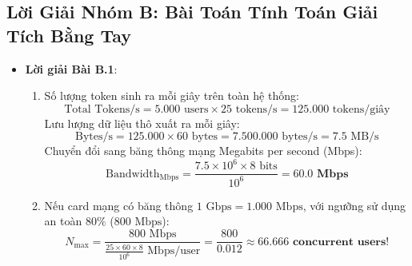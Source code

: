 \subsection{Lời Giải Nhóm B: Bài Toán Tính Toán Giải Tích Bằng Tay}
\begin{itemize}
  \item \textbf{Lời giải Bài B.1}:
  \begin{enumerate}
    \item Số lượng token sinh ra mỗi giây trên toàn hệ thống:
    \begin{equation*}
    \text{Total Tokens/s} = 5.000\text{ users} \times 25\text{ tokens/s} = 125.000\text{ tokens/giây}
    \end{equation*}
    Lưu lượng dữ liệu thô xuất ra mỗi giây:
    \begin{equation*}
    \text{Bytes/s} = 125.000 \times 60\text{ bytes} = 7.500.000\text{ bytes/s} = 7.5\text{ MB/s}
    \end{equation*}
    Chuyển đổi sang băng thông mạng Megabits per second (Mbps):
    \begin{equation*}
    \text{Bandwidth}_{\text{Mbps}} = \frac{7.5 \times 10^6 \times 8\text{ bits}}{10^6} = \mathbf{60.0\text{ Mbps}}
    \end{equation*}
    \item Nếu card mạng có băng thông $1\text{ Gbps} = 1.000\text{ Mbps}$, với ngưỡng sử dụng an toàn $80\%$ ($800\text{ Mbps}$):
    \begin{equation*}
    N_{\max} = \frac{800\text{ Mbps}}{\frac{25 \times 60 \times 8}{10^6}\text{ Mbps/user}} = \frac{800}{0.012} \approx \mathbf{66.666\text{ concurrent users!}}
    \end{equation*}
  \end{enumerate}


\end{itemize}
